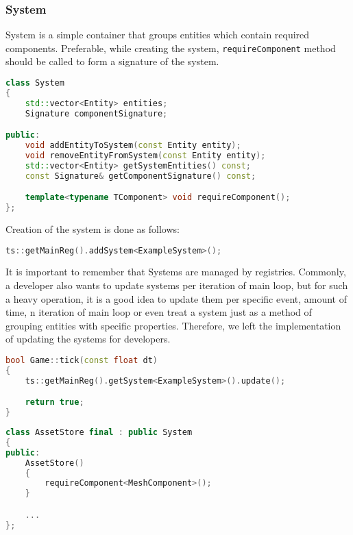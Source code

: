\subsubsection{System}
\hspace{\parindent}
System is a simple container that groups entities which contain required components. Preferable, while creating the system, \texttt{requireComponent} method should be called to form a signature of the system.
\begin{lstlisting}[language=c++, caption=\texttt{System} class (./engine/include/tsengine/ecs/ecs.h)]
class System
{
    std::vector<Entity> entities;
    Signature componentSignature;

public:
    void addEntityToSystem(const Entity entity);
    void removeEntityFromSystem(const Entity entity);
    std::vector<Entity> getSystemEntities() const;
    const Signature& getComponentSignature() const;

    template<typename TComponent> void requireComponent();
};
\end{lstlisting}

Creation of the system is done as follows:
\begin{lstlisting}[language=c++, caption=Creation of the system (./game/game.cpp)]
    ts::getMainReg().addSystem<ExampleSystem>();
\end{lstlisting}

It is important to remember that Systems are managed by registries. Commonly, a developer also wants to update systems per iteration of main loop, but for such a heavy operation, it is a good idea to update them per specific event, amount of time, n iteration of main loop or even treat a system just as a method of grouping entities with specific properties. Therefore, we left the implementation of updating the systems for developers.

\begin{lstlisting}[language=c++, caption=Update of systems every iteration of the main loop(./game/game.cpp)]
bool Game::tick(const float dt)
{
    ts::getMainReg().getSystem<ExampleSystem>().update();

    return true;
}
\end{lstlisting}

\begin{lstlisting}[language=c++, caption=System as a method of grouping entities (./game/game.cpp)]
class AssetStore final : public System
{
public:
    AssetStore()
    {
        requireComponent<MeshComponent>();
    }

    ...
};
\end{lstlisting}

